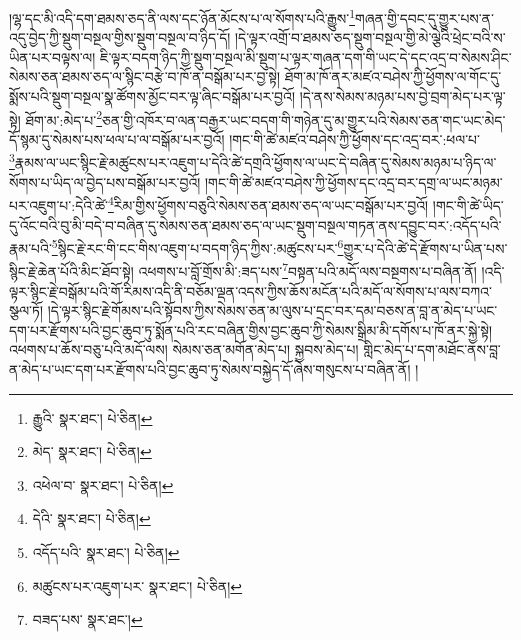 །ལྷ་དང་མི་འདི་དག་ཐམས་ཅད་ནི་ལས་དང་ཉོན་མོངས་པ་ལ་སོགས་པའི་རྒྱུས་\footnote{རྒྱུའི་  སྣར་ཐང་།  པེ་ཅིན། }གཞན་གྱི་དབང་དུ་གྱུར་པས་ན་འདུ་བྱེད་ཀྱི་སྡུག་བསྔལ་གྱིས་སྡུག་བསྔལ་བ་ཉིད་དོ། །དེ་ལྟར་འགྲོ་བ་ཐམས་ཅད་སྡུག་བསྔལ་གྱི་མེ་ལྕེའི་ཕྲེང་བའི་ས་ཡིན་པར་བལྟས་ལ། ཇི་ལྟར་བདག་ཉིད་ཀྱི་སྡུག་བསྔལ་མི་སྡུག་པ་ལྟར་གཞན་དག་གི་ཡང་དེ་དང་འདྲ་བ་སེམས་ཤིང་སེམས་ཅན་ཐམས་ཅད་ལ་སྙིང་བརྩེ་བ་ཁོ་ན་བསྒོམ་པར་བྱ་སྟེ། ཐོག་མ་ཁོ་ནར་མཛའ་བཤེས་ཀྱི་ཕྱོགས་ལ་གོང་དུ་སྨོས་པའི་སྡུག་བསྔལ་སྣ་ཚོགས་མྱོང་བར་ལྟ་ཞིང་བསྒོམ་པར་བྱའོ། །དེ་ནས་སེམས་མཉམ་པས་བྱེ་བྲག་མེད་པར་ལྟ་སྟེ། ཐོག་མ་:མེད་པ་\footnote{མེད་  སྣར་ཐང་།  པེ་ཅིན། }ཅན་གྱི་འཁོར་བ་ལན་བརྒྱར་ཡང་བདག་གི་གཉེན་དུ་མ་གྱུར་པའི་སེམས་ཅན་གང་ཡང་མེད་དོ་སྙམ་དུ་སེམས་པས་ཕལ་པ་ལ་བསྒོམ་པར་བྱའོ། །གང་གི་ཚེ་མཛའ་བཤེས་ཀྱི་ཕྱོགས་དང་འདྲ་བར་:ཕལ་པ་\footnote{འཕེལ་བ་  སྣར་ཐང་།  པེ་ཅིན། }རྣམས་ལ་ཡང་སྙིང་རྗེ་མཚུངས་པར་འཇུག་པ་དེའི་ཚེ་དགྲའི་ཕྱོགས་ལ་ཡང་དེ་བཞིན་དུ་སེམས་མཉམ་པ་ཉིད་ལ་སོགས་པ་ཡིད་ལ་བྱེད་པས་བསྒོམ་པར་བྱའོ། །གང་གི་ཚེ་མཛའ་བཤེས་ཀྱི་ཕྱོགས་དང་འདྲ་བར་དགྲ་ལ་ཡང་མཉམ་པར་འཇུག་པ་:དེའི་ཚེ་\footnote{དེའི་  སྣར་ཐང་།  པེ་ཅིན། }རིམ་གྱིས་ཕྱོགས་བཅུའི་སེམས་ཅན་ཐམས་ཅད་ལ་ཡང་བསྒོམ་པར་བྱའོ། །གང་གི་ཚེ་ཡིད་དུ་འོང་བའི་བུ་མི་བདེ་བ་བཞིན་དུ་སེམས་ཅན་ཐམས་ཅད་ལ་ཡང་སྡུག་བསྔལ་གཏན་ནས་དབྱུང་བར་:འདོད་པའི་རྣམ་པའི་\footnote{འདོད་པའི་  སྣར་ཐང་།  པེ་ཅིན། }སྙིང་རྗེ་རང་གི་ངང་གིས་འཇུག་པ་བདག་ཉིད་ཀྱིས་:མཚུངས་པར་\footnote{མཚུངས་པར་འཇུག་པར་  སྣར་ཐང་།  པེ་ཅིན། }གྱུར་པ་དེའི་ཚེ་དེ་རྫོགས་པ་ཡིན་པས་སྙིང་རྗེ་ཆེན་པོའི་མིང་ཐོབ་སྟེ། འཕགས་པ་བློ་གྲོས་མི་:ཟད་པས་\footnote{བཟད་པས་  སྣར་ཐང་། }བསྟན་པའི་མདོ་ལས་བསྔགས་པ་བཞིན་ནོ། །འདི་ལྟར་སྙིང་རྗེ་བསྒོམ་པའི་གོ་རིམས་འདི་ནི་བཅོམ་ལྡན་འདས་ཀྱིས་ཆོས་མངོན་པའི་མདོ་ལ་སོགས་པ་ལས་བཀའ་སྩལ་ཏོ། །དེ་ལྟར་སྙིང་རྗེ་གོམས་པའི་སྟོབས་ཀྱིས་སེམས་ཅན་མ་ལུས་པ་དྲང་བར་དམ་བཅས་ན་བླ་ན་མེད་པ་ཡང་དག་པར་རྫོགས་པའི་བྱང་ཆུབ་ཏུ་སྨོན་པའི་རང་བཞིན་གྱིས་བྱང་ཆུབ་ཀྱི་སེམས་སྒྲིམ་མི་དགོས་པ་ཁོ་ནར་སྐྱེ་སྟེ། འཕགས་པ་ཆོས་བཅུ་པའི་མདོ་ལས། སེམས་ཅན་མགོན་མེད་པ། སྐྱབས་མེད་པ། གླིང་མེད་པ་དག་མཐོང་ནས་བླ་ན་མེད་པ་ཡང་དག་པར་རྫོགས་པའི་བྱང་ཆུབ་ཏུ་སེམས་བསྐྱེད་དོ་ཞེས་གསུངས་པ་བཞིན་ནོ། །
